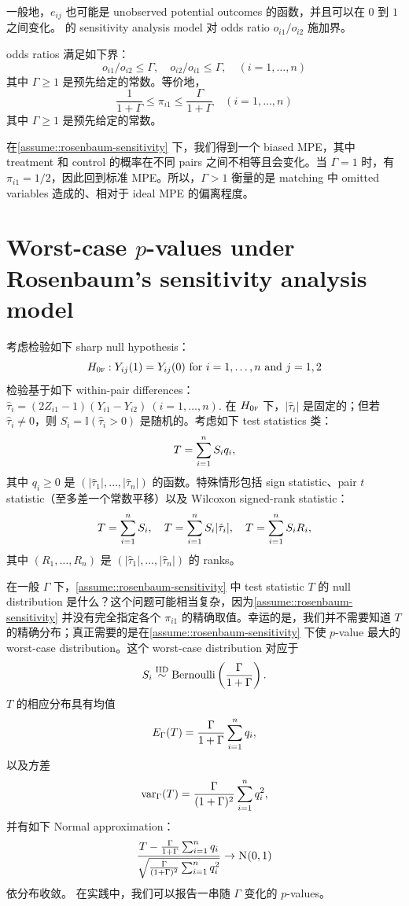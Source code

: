 一般地，$e_{ij}$ 也可能是 unobserved potential outcomes 的函数，并且可以在 $0$ 到 $1$ 之间变化。
\citet{rosenbaum1987sensitivity} 的 sensitivity analysis model 对 odds ratio $o_{i1}/o_{i2}$ 施加界。

\begin{assumption}\label{assume::rosenbaum-sensitivity}
odds ratios 满足如下界：
$$
o_{i1}/o_{i2} \leq \Gamma,\quad
o_{i2}/o_{i1} \leq \Gamma, \quad (i=1, \ldots, n)
$$
其中 $\Gamma \geq 1$ 是预先给定的常数。等价地，
$$ 
\frac{1}{1+\Gamma } \leq 
\pi_{i1} \leq \frac{\Gamma}{1+\Gamma} \quad (i=1, \ldots, n)
$$
其中 $\Gamma \geq 1$ 是预先给定的常数。
\end{assumption}


在\cref{assume::rosenbaum-sensitivity} 下，我们得到一个 biased MPE，其中 treatment 和 control 的概率在不同 pairs 之间不相等且会变化。当 $\Gamma = 1$ 时，有 $\pi_{i1} = 1/2$，因此回到标准 MPE。所以，$\Gamma > 1$ 衡量的是 matching 中 omitted variables 造成的、相对于 ideal MPE 的偏离程度。
 
 
 
 \section{Worst-case $p$-values under Rosenbaum's sensitivity analysis model}


考虑检验如下 sharp null hypothesis：
$$
H_{0\textsc{f}}: Y_{ij}(1) = Y_{ij}(0) \text{ for } i = 1,\ldots, n \text{ and } j=1,2
$$
检验基于如下 within-pair differences：
$
\hat{\tau}_i = (2Z_{i1} - 1) (Y_{i1} - Y_{i2}) \  (i=1,\ldots, n). 
$
在 $H_{0\textsc{f}}$ 下，$|\hat{\tau}_i|$ 是固定的；但若 $\hat{\tau}_i \neq 0$，则 $S_i = \mathbb{I}(\hat{\tau}_i > 0)$ 是随机的。考虑如下 test statistics 类：
$$
T = \sum_{i=1}^n S_i q_i,
$$
其中 $q_i\geq 0$ 是 $ (|\hat{\tau}_1|, \ldots, |\hat{\tau}_n|)$ 的函数。特殊情形包括 sign statistic、pair $t$ statistic（至多差一个常数平移）以及 Wilcoxon signed-rank statistic：
$$
T = \sum_{i=1}^n S_i,\quad T = \sum_{i=1}^n S_i |\hat{\tau}_i|,\quad T = \sum_{i=1}^n S_i R_i,
$$
其中 $(R_1,\ldots, R_n)$ 是 $ (|\hat{\tau}_1|, \ldots, |\hat{\tau}_n|)$ 的 ranks。

在一般 $\Gamma$ 下，\cref{assume::rosenbaum-sensitivity} 中 test statistic $T$ 的 null distribution 是什么？这个问题可能相当复杂，因为\cref{assume::rosenbaum-sensitivity} 并没有完全指定各个 $\pi_{i1}$ 的精确取值。幸运的是，我们并不需要知道 $T$ 的精确分布；真正需要的是在\cref{assume::rosenbaum-sensitivity} 下使 $p$-value 最大的 worst-case distribution。这个 worst-case distribution 对应于
$$
S_i \stackrel{\textup{IID}}{\sim}  \text{Bernoulli}\left(  \frac{ \Gamma}{ 1+\Gamma} \right).
$$
$T$ 的相应分布具有均值
$$
E_\Gamma( T ) = \frac{\Gamma}{1+\Gamma} \sum_{i=1}^n q_i, 
$$
以及方差
$$
\textup{var}_\Gamma( T ) = \frac{\Gamma}{(1+\Gamma)^2} \sum_{i=1}^n q_i^2,
$$
并有如下 Normal approximation：
$$
\frac{T -\frac{\Gamma}{1+\Gamma} \sumn q_i }{ \sqrt{ \frac{\Gamma}{(1+\Gamma)^2} \sumn q_i^2  }} \rightarrow  \N01 
$$
依分布收敛。
在实践中，我们可以报告一串随 $\Gamma$ 变化的 $p$-values。


